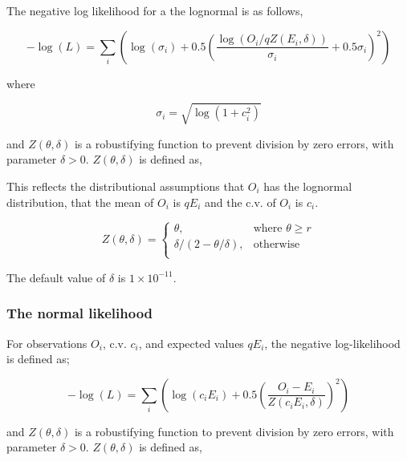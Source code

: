 {{{{The negative log likelihood for a the lognormal is as follows,

\begin{equation}
- \log \left(L \right) = \sum\limits_i \left( \log \left( \sigma _i \right) + 0.5\left( \frac{\log \left(O_i / q Z \left(E_i,\delta \right) \right)}{\sigma_i} + 0.5 \sigma_i \right)^2 \right)
\end{equation}

where 

\begin{equation}
\sigma_i  = \sqrt{\log \left(1+c_i^2 \right)}
\end{equation}

and $Z \left(\theta,\delta \right)$ is a robustifying function to prevent division by zero errors, with parameter $\delta>0$. $Z \left(\theta,\delta \right)$ is defined as,

This reflects the distributional assumptions that  $O_i$ has the lognormal distribution, that the mean of $O_i$ is $qE_i$  and the c.v. of $O_i$ is $c_i$.

\begin{equation}
Z \left(\theta,\delta \right) = \begin{cases}
\theta, & \text{where $\theta \ge r$} \\
\delta/\left( 2-\theta/\delta \right), & \text{otherwise} \\  
\end{cases}
\end{equation}

The default value of $\delta$ is $1 \times 10^{-11}$.

\subsubsection*{The normal likelihood}

For observations $O_i$, c.v. $c_i$, and expected values $qE_i$, the negative log-likelihood is defined as;

\begin{equation}
- \log \left(L \right) = \sum\limits_i \left( \log \left( c_i E_i \right) +0.5 \left( \frac{O_i-E_i}{Z\left(c_i E_i,\delta \right)}\right)^2\right)
\end{equation}

and $Z \left(\theta,\delta \right)$ is a robustifying function to prevent division by zero errors, with parameter $\delta>0$. $Z \left(\theta,\delta \right)$ is defined as,

}}}}
